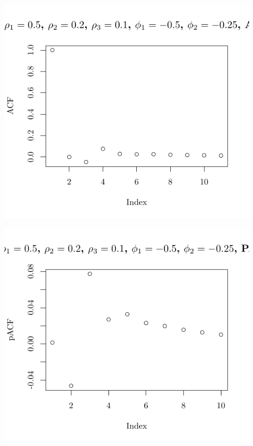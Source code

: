 \documentclass[10pt]{paper}\usepackage[]{graphicx}\usepackage[]{color}
\makeatletter
\def\maxwidth{ %
  \ifdim\Gin@nat@width>\linewidth
    \linewidth
  \else
    \Gin@nat@width
  \fi
}
\newenvironment{knitrout}{}{} %
\makeatother
\begin{document}
\begin{knitrout}
{\centering \includegraphics[width=\maxwidth]{figure/graphics-plotter-201} 

}




{\centering \includegraphics[width=\maxwidth]{figure/graphics-plotter-202} 

}





\end{knitrout}
\end{document}

